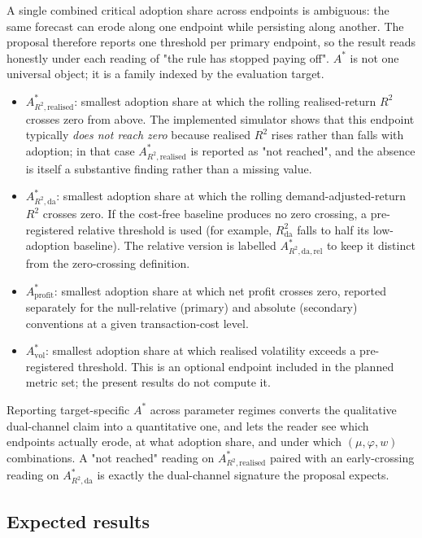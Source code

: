 \documentclass[11pt]{article}
\begin{document}
A single combined critical adoption share across endpoints is ambiguous: the same forecast can erode along one endpoint while persisting along another. The proposal therefore reports one threshold per primary endpoint, so the result reads honestly under each reading of "the rule has stopped paying off". $A^{*}$ is not one universal object; it is a family indexed by the evaluation target.

\begin{itemize}[itemsep=0.2em]
  \item \textbf{$A^{*}_{R^{2},\mathrm{realised}}$}: smallest adoption share at which the rolling realised-return $R^{2}$ crosses zero from above. The implemented simulator shows that this endpoint typically \emph{does not reach zero} because realised $R^{2}$ rises rather than falls with adoption; in that case $A^{*}_{R^{2},\mathrm{realised}}$ is reported as "not reached", and the absence is itself a substantive finding rather than a missing value.
  \item \textbf{$A^{*}_{R^{2},\mathrm{da}}$}: smallest adoption share at which the rolling demand-adjusted-return $R^{2}$ crosses zero. If the cost-free baseline produces no zero crossing, a pre-registered relative threshold is used (for example, $R^{2}_{\mathrm{da}}$ falls to half its low-adoption baseline). The relative version is labelled $A^{*}_{R^{2},\mathrm{da},\mathrm{rel}}$ to keep it distinct from the zero-crossing definition.
  \item \textbf{$A^{*}_{\mathrm{profit}}$}: smallest adoption share at which net profit crosses zero, reported separately for the null-relative (primary) and absolute (secondary) conventions at a given transaction-cost level.
  \item \textbf{$A^{*}_{\mathrm{vol}}$}: smallest adoption share at which realised volatility exceeds a pre-registered threshold. This is an optional endpoint included in the planned metric set; the present results do not compute it.
\end{itemize}

Reporting target-specific $A^{*}$ across parameter regimes converts the qualitative dual-channel claim into a quantitative one, and lets the reader see which endpoints actually erode, at what adoption share, and under which $(\mu, \varphi, w)$ combinations. A "not reached" reading on $A^{*}_{R^{2},\mathrm{realised}}$ paired with an early-crossing reading on $A^{*}_{R^{2},\mathrm{da}}$ is exactly the dual-channel signature the proposal expects.

\subsection{Expected results}
\end{document}
